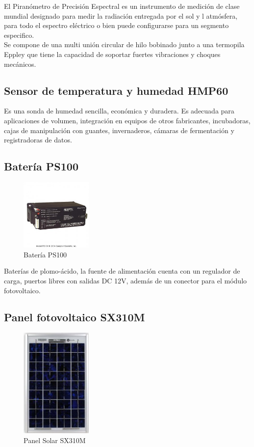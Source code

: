 El Piranómetro de Precisión Espectral es un instrumento de medición de clase mundial designado para medir la radiación entregada por el sol y l atmósfera, para todo el espectro eléctrico o bien puede configurarse para un segmento especifico.\\
Se compone de una multi unión circular de hilo bobinado junto a una termopila Eppley que tiene la capacidad de soportar fuertes vibraciones y choques mecánicos.

\subsection{Sensor de temperatura y humedad HMP60}
Es una sonda de humedad sencilla, económica y duradera. Es adecuada para aplicaciones de volumen, integración en equipos de otros fabricantes, incubadoras, cajas de manipulación con guantes, invernaderos, cámaras de fermentación y registradoras de datos.

\subsection{Batería PS100}

\begin{figure}[h!]
        \centering
        \includegraphics[width=100pt]{images/bateria}
        \caption{Batería PS100} 
\end{figure}

Baterías de plomo-ácido, la fuente de alimentación cuenta con un regulador de carga, puertos libres con salidas DC 12V, además de un conector para el módulo fotovoltaico.

\subsection{Panel fotovoltaico SX310M}

\begin{figure}[h!]
        \centering
        \includegraphics[width=100pt]{images/panelSolar}
        \caption{Panel Solar SX310M} 
\end{figure}

